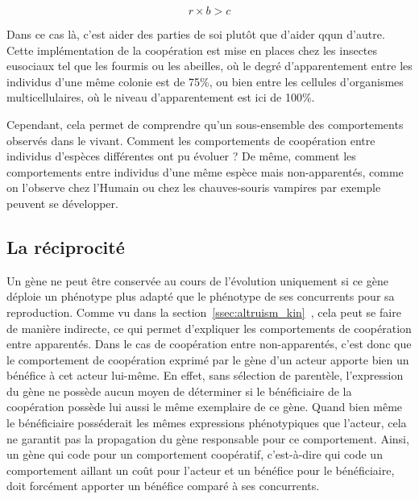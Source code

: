 \begin{equation}
r \times b > c \label{eq:hamiltonrule}
\end{equation}


Dans ce cas là, c'est aider des parties de soi plutôt que d'aider qqun d'autre. Cette implémentation de la coopération est mise en places chez les insectes eusociaux tel que les fourmis ou les abeilles, où le degré d'apparentement entre les individus d'une même colonie est de 75\%, ou bien entre les cellules d'organismes multicellulaires, où le niveau d'apparentement est ici de 100\%.

Cependant, cela permet de comprendre qu'un sous-ensemble des comportements observés dans le vivant. Comment les comportements de coopération entre individus d'espèces différentes ont pu évoluer ? De même, comment les comportements entre individus d'une même espèce mais non-apparentés, comme on l'observe chez l'Humain ou chez les chauves-souris vampires par exemple peuvent se développer.

\subsection{La réciprocité}

Un gène ne peut être conservée au cours de l'évolution uniquement si ce gène déploie un phénotype plus adapté que le phénotype de ses concurrents pour sa reproduction. Comme vu dans la section~\ref{ssec:altruism_kin}~\emph{}, cela peut se faire de manière indirecte, ce qui permet d'expliquer les comportements de coopération entre apparentés. Dans le cas de coopération entre non-apparentés, c'est donc que le comportement de coopération exprimé par le gène d'un acteur apporte bien un bénéfice à cet acteur lui-même. En effet, sans sélection de parentèle, l'expression du gène ne possède aucun moyen de déterminer si le bénéficiaire de la coopération possède lui aussi le même exemplaire de ce gène. Quand bien même le bénéficiaire posséderait les mêmes expressions phénotypiques que l'acteur, cela ne garantit pas la propagation du gène responsable pour ce comportement.  Ainsi, un gène qui code pour un comportement coopératif, c'est-à-dire qui code un comportement aillant un coût pour l'acteur et un bénéfice pour le bénéficiaire, doit forcément apporter un bénéfice comparé à ses concurrents.

